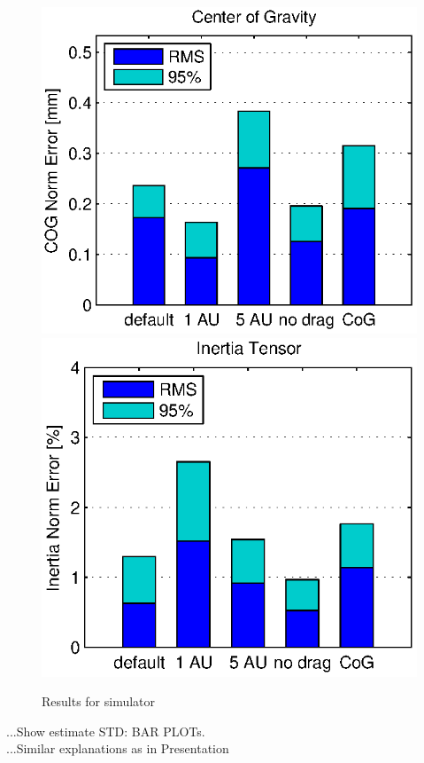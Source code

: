 \begin{figure}[hbtp]
\includegraphics[scale=.72]{images/results/err_cmp_sim_cog.eps}
\includegraphics[scale=.72]{images/results/err_cmp_sim_tensor.eps}
\caption{Results for simulator}
\label{fig:tangential_frame}
\end{figure}



...Show estimate STD: BAR PLOTs.\\
...Similar explanations as in Presentation

